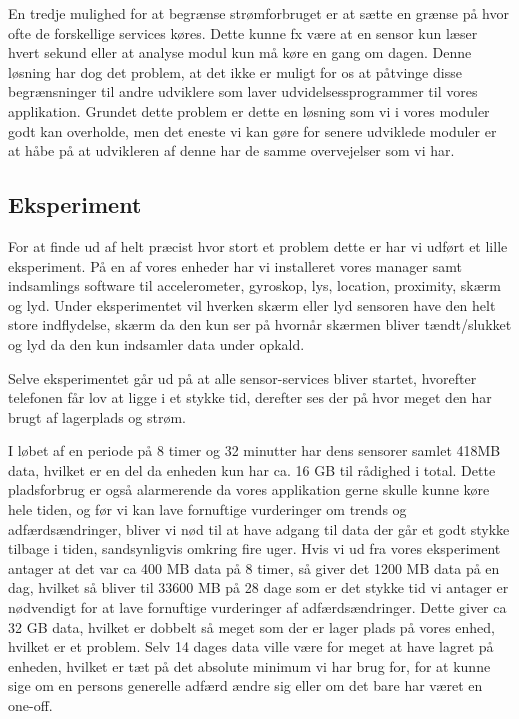 En tredje mulighed for at begrænse strømforbruget er at sætte en grænse på hvor ofte de forskellige services køres.
Dette kunne fx være at en sensor kun læser hvert sekund eller at analyse modul kun må køre en gang om dagen.
Denne løsning har dog det problem, at det ikke er muligt for os at påtvinge disse begrænsninger til andre udviklere som laver udvidelsessprogrammer til vores applikation.
Grundet dette problem er dette en løsning som vi i vores moduler godt kan overholde, men det eneste vi kan gøre for senere udviklede moduler er at håbe på at udvikleren af denne har de samme overvejelser som vi har. 

\subsection{Eksperiment}
For at finde ud af helt præcist hvor stort et problem dette er har vi udført et lille eksperiment.
På en af vores enheder har vi installeret vores manager samt indsamlings software til accelerometer, gyroskop, lys, location, proximity, skærm og lyd.
Under eksperimentet vil hverken skærm eller lyd sensoren have den helt store indflydelse, skærm da den kun ser på hvornår skærmen bliver tændt/slukket og lyd da den kun indsamler data under opkald.

Selve eksperimentet går ud på at alle sensor-services bliver startet, hvorefter telefonen får lov at ligge i et stykke tid, derefter ses der på hvor meget den har brugt af lagerplads og strøm.

I løbet af en periode på 8 timer og 32 minutter har dens sensorer samlet 418MB data, hvilket er en del da enheden kun har ca. 16 GB til rådighed i total.
Dette pladsforbrug er også alarmerende da vores applikation gerne skulle kunne køre hele tiden, og før vi kan lave fornuftige vurderinger om trends og adfærdsændringer, bliver vi nød til at have adgang til data der går et godt stykke tilbage i tiden, sandsynligvis omkring fire uger.
Hvis vi ud fra vores eksperiment antager at det var ca 400 MB data på 8 timer, så giver det 1200 MB data på en dag, hvilket så bliver til 33600 MB på 28 dage som er det stykke tid vi antager er nødvendigt for at lave fornuftige vurderinger af adfærdsændringer.
Dette giver ca 32 GB data, hvilket er dobbelt så meget som der er lager plads på vores enhed, hvilket er et problem.
Selv 14 dages data ville være for meget at have lagret på enheden, hvilket er tæt på det absolute minimum vi har brug for, for at kunne sige om en persons generelle adfærd ændre sig eller om det bare har været en one-off.

